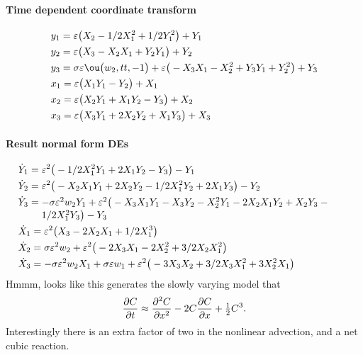 \paragraph{Time dependent coordinate transform}
\begin{align*}&
y_{1}=\eps \big(X_{2}-1/2 X_{1}^{2}+1/2 Y_{1}^{2}\big)+Y_{1}
\\&
y_{2}=\eps \big(X_{3}-X_{2} X_{1}+Y_{2} Y_{1}\big)+Y_{2}
\\&
y_{3}=\sigma  \eps \ou\big(w_{2},tt,-1\big)+\eps \big(-X_{3} X_{1}-X_{2}
^{2}+Y_{3} Y_{1}+Y_{2}^{2}\big)+Y_{3}
\\&
x_{1}=\eps \big(X_{1} Y_{1}-Y_{2}\big)+X_{1}
\\&
x_{2}=\eps \big(X_{2} Y_{1}+X_{1} Y_{2}-Y_{3}\big)+X_{2}
\\&
x_{3}=\eps \big(X_{3} Y_{1}+2 X_{2} Y_{2}+X_{1} Y_{3}\big)+X_{3}
\end{align*}

\paragraph{Result normal form DEs}
\begin{align*}&
\dot Y_{1}=\eps^{2} \big(-1/2 X_{1}^{2} Y_{1}+2 X_{1} Y_{2}-Y_{3}\big)-Y
_{1}
\\&
\dot Y_{2}=\eps^{2} \big(-X_{2} X_{1} Y_{1}+2 X_{2} Y_{2}-1/2 X_{1}^{2} 
Y_{2}+2 X_{1} Y_{3}\big)-Y_{2}
\\&
\dot Y_{3}=\ParMath{ -\sigma  \eps^{2} w_{2} Y_{1}+\eps^{2} \big(-X_{3} X_{1} Y_{1
}-X_{3} Y_{2}-X_{2}^{2} Y_{1}-2 X_{2} X_{1} Y_{2}+X_{2} Y_{3}-1/2 X_{1}
^{2} Y_{3}\big)-Y_{3}
}\\&
\dot X_{1}=\eps^{2} \big(X_{3}-2 X_{2} X_{1}+1/2 X_{1}^{3}\big)
\\&
\dot X_{2}=\sigma  \eps^{2} w_{2}+\eps^{2} \big(-2 X_{3} X_{1}-2 X_{2}^{
2}+3/2 X_{2} X_{1}^{2}\big)
\\&
\dot X_{3}=-\sigma  \eps^{2} w_{2} X_{1}+\sigma  \eps w_{1}+\eps^{2} 
\big(-3 X_{3} X_{2}+3/2 X_{3} X_{1}^{2}+3 X_{2}^{2} X_{1}\big)
\end{align*}
Hmmm, looks like this generates the slowly varying model that
\begin{equation*}
\D tC\approx \DD xC-2C\D xC+\rat12C^3.
\end{equation*}
Interestingly there is an extra factor of two in the nonlinear advection, and a net cubic reaction.


